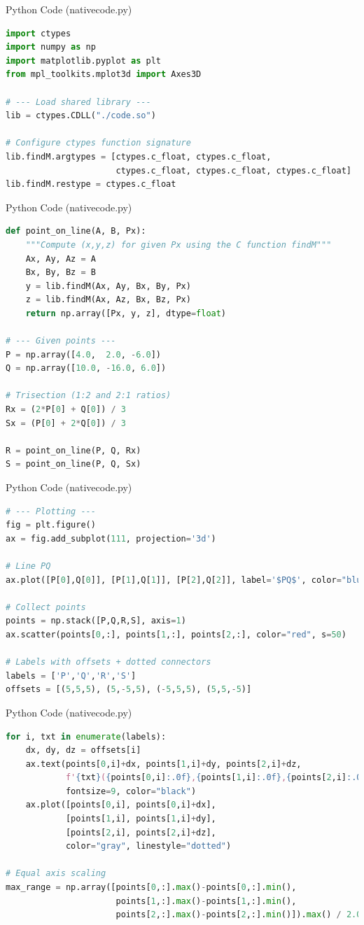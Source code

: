 \documentclass{beamer}
\begin{document}
\begin{frame}[fragile]{Python Code (nativecode.py)}
\begin{lstlisting}[language=Python]
import ctypes
import numpy as np
import matplotlib.pyplot as plt
from mpl_toolkits.mplot3d import Axes3D

# --- Load shared library ---
lib = ctypes.CDLL("./code.so")

# Configure ctypes function signature
lib.findM.argtypes = [ctypes.c_float, ctypes.c_float,
                      ctypes.c_float, ctypes.c_float, ctypes.c_float]
lib.findM.restype = ctypes.c_float
\end{lstlisting}
\end{frame}
\begin{frame}[fragile]{Python Code (nativecode.py)}
\begin{lstlisting}[language=Python]
def point_on_line(A, B, Px):
    """Compute (x,y,z) for given Px using the C function findM"""
    Ax, Ay, Az = A
    Bx, By, Bz = B
    y = lib.findM(Ax, Ay, Bx, By, Px)
    z = lib.findM(Ax, Az, Bx, Bz, Px)
    return np.array([Px, y, z], dtype=float)

# --- Given points ---
P = np.array([4.0,  2.0, -6.0])
Q = np.array([10.0, -16.0, 6.0])

# Trisection (1:2 and 2:1 ratios)
Rx = (2*P[0] + Q[0]) / 3
Sx = (P[0] + 2*Q[0]) / 3

R = point_on_line(P, Q, Rx)
S = point_on_line(P, Q, Sx)
\end{lstlisting}
\end{frame}
\begin{frame}[fragile]{Python Code (nativecode.py)}
\begin{lstlisting}[language=Python]
# --- Plotting ---
fig = plt.figure()
ax = fig.add_subplot(111, projection='3d')

# Line PQ
ax.plot([P[0],Q[0]], [P[1],Q[1]], [P[2],Q[2]], label='$PQ$', color="blue")

# Collect points
points = np.stack([P,Q,R,S], axis=1)
ax.scatter(points[0,:], points[1,:], points[2,:], color="red", s=50)

# Labels with offsets + dotted connectors
labels = ['P','Q','R','S']
offsets = [(5,5,5), (5,-5,5), (-5,5,5), (5,5,-5)]
\end{lstlisting}
\end{frame}
\begin{frame}[fragile]{Python Code (nativecode.py)}
\begin{lstlisting}[language=Python]
for i, txt in enumerate(labels):
    dx, dy, dz = offsets[i]
    ax.text(points[0,i]+dx, points[1,i]+dy, points[2,i]+dz,
            f'{txt}({points[0,i]:.0f},{points[1,i]:.0f},{points[2,i]:.0f})',
            fontsize=9, color="black")
    ax.plot([points[0,i], points[0,i]+dx],
            [points[1,i], points[1,i]+dy],
            [points[2,i], points[2,i]+dz],
            color="gray", linestyle="dotted")

# Equal axis scaling
max_range = np.array([points[0,:].max()-points[0,:].min(),
                      points[1,:].max()-points[1,:].min(),
                      points[2,:].max()-points[2,:].min()]).max() / 2.0
\end{lstlisting}
\end{frame}
\end{document}
